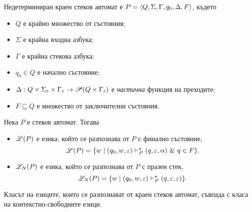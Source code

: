 \begin{dfn}
  Недетерминиран краен стеков автомат е $P = \langle{Q,\Sigma,\Gamma,q_{0},\Delta,F}\rangle$, където 
  \begin{itemize}
  \item
    $Q$ е крайно множество от състояния;
  \item  
    $\Sigma$ е крайна входна азбука;
  \item
    $\Gamma$ е крайна стекова азбука;
  \item
    $q_{0}\in Q$ е начално състояние;
  \item
    $\Delta:Q\times\Sigma_\varepsilon\times\Gamma_\varepsilon\rightarrow \mathscr{P}(Q\times\Gamma_\varepsilon)$ 
    е {\em частична} функция на преходите;    
  \item
    $F\subseteq Q$ е множество от заключителни състояния.
  \end{itemize}
\end{dfn}

Нека $P$ е стеков автомат. Тогава
\begin{itemize}
\item
  $\mathscr{L}(P)$ е езика, който се разпознава от $P$ с финално състояние,
  \[\mathscr{L}(P) = \{w\mid (q_0,w,\varepsilon) \vdash^\star_P (q,\varepsilon,\alpha)\ \&\ q \in F\}.\]    
\item
  $\mathscr{L}_N(P)$ е езика, който се разпознава от $P$ с празен стек,
  \[\mathscr{L}_N(P) = \{w\mid (q_0,w,\varepsilon) \vdash^\star_P (q,\varepsilon,\varepsilon)\}.\]    
\end{itemize}

\begin{thm}
  Класът на езиците, които се разпознават от краен стеков автомат, съвпада с
  класа на контекстно-свободните езици.
\end{thm}




